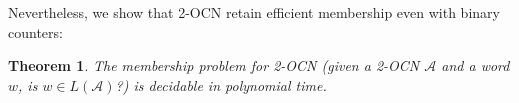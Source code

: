 \documentclass[11pt,a4paper]{amsart}
\newtheorem{theorem}{Theorem}
\theoremstyle{definition}
\newcommand{\shtodo}[1]{\todo[color=cyan!25,size=\small]{SH: #1}}
\newcommand{\tup}[1]{\langle #1 \rangle}
\newcommand{\initstate}{q_{\mathrm{init}}}
\newcommand{\accstate}{q_{\mathrm{acc}}}
\newcommand{\cA}{\mathcal{A}}
\begin{document}
Nevertheless, we show that 2-OCN retain efficient membership even with binary
counters:
\begin{theorem}
	\label{thm:membership_PTIME}
	The membership problem for 2-OCN (given a 2-OCN $\cA$ and a word $w$, is $w\in
	L(\cA)$?) is decidable in polynomial time.
\end{theorem}
	
	
\end{document}
